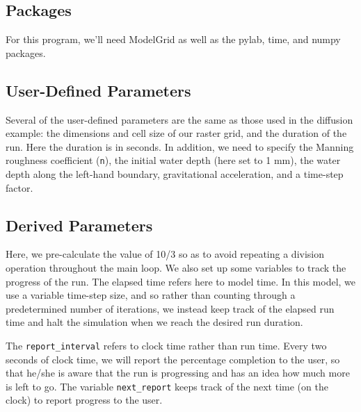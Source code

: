 \documentclass[12pt]{article}
\newcommand{\code}[1]{{\tt #1}}
\begin{document}


\subsection{Packages}



For this program, we'll need ModelGrid as well as the pylab, time, and numpy packages.

\subsection{User-Defined Parameters}



Several of the user-defined parameters are the same as those used in the diffusion example: the dimensions and cell size of our raster grid, and the duration of the run. Here the duration is in seconds. In addition, we need to specify the Manning roughness coefficient (\code{n}), the initial water depth (here set to 1 mm), the water depth along the left-hand boundary, gravitational acceleration, and a time-step factor.

\subsection{Derived Parameters}



Here, we pre-calculate the value of 10/3 so as to avoid repeating a division operation throughout the main loop. We also set up some variables to track the progress of the run. The elapsed time refers here to model time. In this model, we use a variable time-step size, and so rather than counting through a predetermined number of iterations, we instead keep track of the elapsed run time and halt the simulation when we reach the desired run duration.

The \code{report\_interval} refers to clock time rather than run time. Every two seconds of clock time, we will report the percentage completion to the user, so that he/she is aware that the run is progressing and has an idea how much more is left to go. The variable \code{next\_report} keeps track of the next time (on the clock) to report progress to the user.
\end{document}
